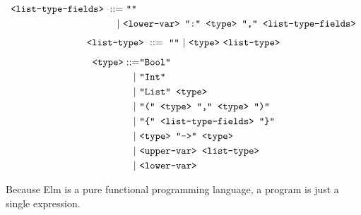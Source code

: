 \documentclass[]{scrbook}
\newcommand{\mf}[1]{\text{\texttt{#1}}}
\theoremstyle{definition}
\theoremstyle{definition}
\theoremstyle{definition}
\theoremstyle{remark}
\begin{document}
\[
\begin{aligned}
\mf{<list-type-fields>} \ ::=& \ \mf{""} \\
                       |\ & \mf{<lower-var> ":" <type> "," <list-type-fields>}
\end{aligned}
\]
\[\mf{<list-type>} \ ::= \ \mf{""} \ | \ \mf{<type>} \ \mf{<list-type>}\]
\[
\begin{aligned}
\mf{<type>} ::=& \mf{"Bool"}\\
              |\ & \mf{"Int"}\\
              |\ & \mf{"List" <type>}\\
              |\ & \mf{"(" <type> "," <type> ")"}\\
              |\ & \mf{"\{" <list-type-fields> "\}"}\\
              |\ & \mf{<type> "->" <type>}\\
              |\ & \mf{<upper-var> <list-type>}\\
              |\ & \mf{<lower-var>}
\end{aligned}
\]

Because Elm is a pure functional programming language, a program is just
a single expression.
\end{document}
